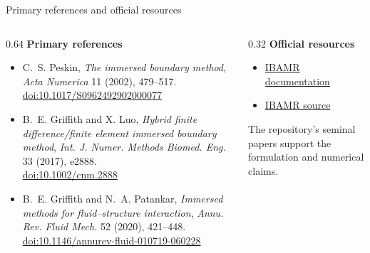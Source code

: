 \documentclass[aspectratio=169,11pt]{beamer}
\begin{document}
\begin{frame}{Primary references and official resources}
\footnotesize
\begin{columns}[T,onlytextwidth]
\begin{column}{0.64\textwidth}
\textbf{Primary references}
\begin{itemize}\itemsep5pt
  \item C.~S. Peskin, \emph{The immersed boundary method}, \emph{Acta Numerica} 11 (2002), 479--517.\\
  \href{https://doi.org/10.1017/S0962492902000077}{doi:10.1017/S0962492902000077}
  \item B.~E. Griffith and X. Luo, \emph{Hybrid finite difference/finite element immersed boundary method}, \emph{Int. J. Numer. Methods Biomed. Eng.} 33 (2017), e2888.\\
  \href{https://doi.org/10.1002/cnm.2888}{doi:10.1002/cnm.2888}
  \item B.~E. Griffith and N.~A. Patankar, \emph{Immersed methods for fluid--structure interaction}, \emph{Annu. Rev. Fluid Mech.} 52 (2020), 421--448.\\
  \href{https://doi.org/10.1146/annurev-fluid-010719-060228}{doi:10.1146/annurev-fluid-010719-060228}
\end{itemize}
\end{column}
\begin{column}{0.32\textwidth}
\textbf{Official resources}
\begin{itemize}\itemsep5pt
  \item \href{https://ibamr.github.io}{IBAMR documentation}
  \item \href{https://github.com/IBAMR/IBAMR}{IBAMR source}
\end{itemize}
\medskip
\begin{punchbox}
\raggedright\small The repository's seminal papers support the formulation and numerical claims.
\end{punchbox}
\end{column}
\end{columns}
\vspace{2pt}
\end{frame}
\end{document}
